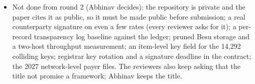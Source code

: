 \begin{itemize}
inpatient, with 78,679,253 service\_code arrays; negotiated\_type: 44.1 M negotiated, 25.3 M fee schedule, 6.9 M percentage, 2.1 M per diem, 0.3 M derived. The parser keeps reading place of service, since the setting field is ``both'' almost everywhere; the text says so. Editor: abstract rewritten to the measured facts (projection, 14.2\% and 30.0\%); Figure 7a (duplicate of Table 2) and Figure 8 (key-rotation timeline) dropped to stay at 10 pages, seven figures remain; gas row dropped.
\item Not done from round 2 (Abhinav decides): the repository is private and the paper cites it as public, so it must be made public before submission; a real counterparty signature on even a few rates (every reviewer asks for it); a per-record transparency log baseline against the ledger; pruned Besu storage and a two-host throughput measurement; an item-level key field for the 14,292 colliding keys; registrar key rotation and a signature deadline in the contract; the 2027 network-level payer files. The reviewers also keep asking that the title not promise a framework; Abhinav keeps the title.

\end{itemize}
